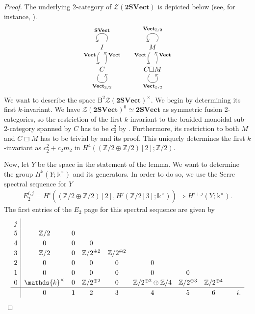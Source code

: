 \documentclass[10pt,a4paper]{amsart}
\numberwithin{equation}{section}
\begin{document}
\begin{proof}
The underlying 2-category of $\mathscr{Z}(\mathbf{2SVect})$ is depicted below (see, for instance, \cite{JFR}). $$\begin{tikzcd}
I \arrow[d, "\mathbf{Vect}"', bend right] \arrow["\mathbf{SVect}"', loop, distance=2em, in=125, out=55] & & M \arrow[d, "\mathbf{Vect}"', bend right] \arrow["\mathbf{Vect}_{\mathbb{Z}/2}"', loop, distance=2em, in=125, out=55] \\
C \arrow[u, "\mathbf{Vect}"', bend right] \arrow["\mathbf{Vect}_{\mathbb{Z}/2}"', loop, distance=2em, in=305, out=235] & & C\Box M \arrow[u, "\mathbf{Vect}"', bend right] \arrow["\mathbf{Vect}_{\mathbb{Z}/2}"', loop, distance=2em, in=305, out=235]
\end{tikzcd}$$ We want to describe the space $\mathrm{B}^2\mathscr{Z}(\mathbf{2SVect})^{\times}$. We begin by determining its first $k$-invariant. We have $\mathscr{Z}(\mathbf{2SVect})^0\simeq \mathbf{2SVect}$ as symmetric fusion 2-categories, so the restriction of the first $k$-invariant to the braided monoidal sub-2-category spanned by $C$ has to be $c_2^2$ by \cite{GJF0}. Furthermore, its restriction to both $M$ and $C\Box M$ has to be trivial by \cite[Theorem~3.2]{JFR} and its proof. This uniquely determines the first $k$-invariant as $c_2^2+c_2m_2$ in $H^4((\mathbb{Z}/2\oplus \mathbb{Z}/2)[2];\mathbb{Z}/2)$.

Now, let $Y$ be the space in the statement of the lemma. We want to determine the group $H^5(Y;\mathds{k}^{\times})$ and its generators. In order to do so, we use the Serre spectral sequence for $Y$
\begin{gather*}
E_2^{i,j}=H^i((\mathbb{Z}/2\oplus\mathbb{Z}/2)[2], H^j(\mathbb{Z}/2[3];\mathds{k}^{\times}))\Rightarrow H^{i+j}(Y;\mathds{k}^{\times}).
\end{gather*}
 The first entries of the $E_2$ page for this spectral sequence are given by
\begin{equation}\renewcommand{\arraystretch}{1.2}\label{eq:E2braided}
 \begin{array}{c|cccccccc}
 j \\
 5 & \mathbb{Z}/2 & 0 \\
 4 & 0 & 0 & 0 \\
 3 & \mathbb{Z}/2 & 0 & \mathbb{Z}/2^{\oplus 2} & \mathbb{Z}/2^{\oplus 2}\\
 2 & 0 & 0 & 0 & 0 & 0 \\
 1 & 0 & 0 & 0 & 0 & 0 & 0 \\
 0 & \mathds{k}^{\times}& 0 & \mathbb{Z}/2^{\oplus 2} & 0 & \mathbb{Z}/2^{\oplus 2}\oplus\mathbb{Z}/4& \mathbb{Z}/2^{\oplus 3} &\mathbb{Z}/2^{\oplus 4}\\
 \hline
 & 0 & 1 & 2 & 3 & 4 & 5 & 6 & \quad i.
\end{array}
\end{equation}


\end{proof}
\end{document}
